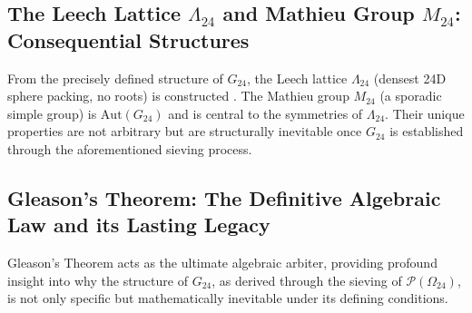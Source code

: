 \documentclass[11pt,a4paper]{article}
\begin{document}
\subsection{The Leech Lattice $\Lambda_{24}$ and Mathieu Group $M_{24}$: Consequential Structures}

From the precisely defined structure of $G_{24}$, the Leech lattice $\Lambda_{24}$ (densest 24D sphere packing, no roots) is constructed \cite{ConwaySloane1999}. The Mathieu group $M_{24}$ (a sporadic simple group) is $\mathrm{Aut}(G_{24})$ and is central to the symmetries of $\Lambda_{24}$. Their unique properties are not arbitrary but are structurally inevitable once $G_{24}$ is established through the aforementioned sieving process.

\subsection{Gleason's Theorem: The Definitive Algebraic Law and its Lasting Legacy}

Gleason’s Theorem acts as the ultimate algebraic arbiter, providing profound insight into why the structure of $G_{24}$, as derived through the sieving of $\mathcal{P}(\Omega_{24})$, is not only specific but mathematically inevitable under its defining conditions.
\end{document}
